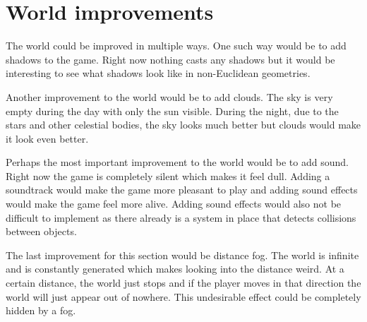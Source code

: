 \section{World improvements}
The world could be improved in multiple ways.
One such way would be to add shadows to the game.
Right now nothing casts any shadows but it would be interesting to see what shadows look like in non-Euclidean geometries.

Another improvement to the world would be to add clouds.
The sky is very empty during the day with only the sun visible.
During the night, due to the stars and other celestial bodies, the sky looks much better but clouds would make it look even better.

Perhaps the most important improvement to the world would be to add sound.
Right now the game is completely silent which makes it feel dull.
Adding a soundtrack would make the game more pleasant to play and adding sound effects would make the game feel more alive.
Adding sound effects would also not be difficult to implement as there already is a system in place that detects collisions between objects.

The last improvement for this section would be distance fog.
The world is infinite and is constantly generated which makes looking into the distance weird.
At a certain distance, the world just stops and if the player moves in that direction the world will just appear out of nowhere.
This undesirable effect could be completely hidden by a fog.